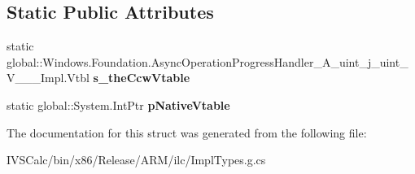 \subsection*{Static Public Attributes}
\begin{DoxyCompactItemize}
\item 
\mbox{\label{struct_windows_1_1_foundation_1_1_async_operation_progress_handler___a__uint__j__uint___v_______impl_1_1_vtbl_a72c7182603beec68d1715920027d22ef}} 
static global\+::\+Windows.\+Foundation.\+Async\+Operation\+Progress\+Handler\+\_\+\+A\+\_\+uint\+\_\+j\+\_\+uint\+\_\+\+V\+\_\+\+\_\+\+\_\+\+Impl.\+Vtbl {\bfseries s\+\_\+the\+Ccw\+Vtable}
\item 
\mbox{\label{struct_windows_1_1_foundation_1_1_async_operation_progress_handler___a__uint__j__uint___v_______impl_1_1_vtbl_a761ffe0d9cf7ad20c5fec9fb4e59da44}} 
static global\+::\+System.\+Int\+Ptr {\bfseries p\+Native\+Vtable}
\end{DoxyCompactItemize}


The documentation for this struct was generated from the following file\+:\begin{DoxyCompactItemize}
\item 
I\+V\+S\+Calc/bin/x86/\+Release/\+A\+R\+M/ilc/Impl\+Types.\+g.\+cs\end{DoxyCompactItemize}
